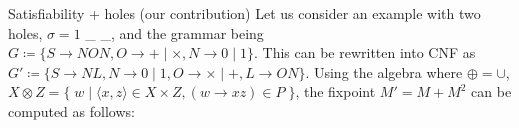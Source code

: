 \documentclass{beamer}
\begin{document}
\begin{frame}[fragile]{Satisfiability + holes (our contribution)}
  Let us consider an example with two holes, $\sigma = 1$ \_ \_, and the grammar being $G\coloneqq\{S\rightarrow N O N, O \rightarrow + \mid \times, N \rightarrow 0 \mid 1\}$. This can be rewritten into CNF as $G'\coloneqq \{S \rightarrow N L, N \rightarrow 0 \mid 1, O \rightarrow × \mid +, L \rightarrow O N\}$. Using the algebra where $\oplus=\cup$, $X \otimes Z = \big\{\;w \mid \langle x, z\rangle \in X \times Z, (w\rightarrow xz) \in P\;\big\}$, the fixpoint $M' = M + M^2$ can be computed as follows:\\\vspace{10pt}

\end{frame}
\end{document}
